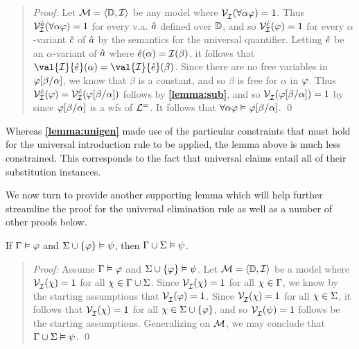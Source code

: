 \begin{quote} 
  \textit{Proof:} Let $\mathcal{M}=\langle\mathbb{D},\mathcal{I}\rangle$ be any model where $\mathcal{V}_{\mathcal{I}}^{}(\forall \alpha\varphi) = 1$.
  Thus $\mathcal{V}_{\mathcal{I}}^{\hat{a}}(\forall \alpha\varphi)=1$ for every v.a. $\hat{a}$ defined over $\mathbb{D}$, and so $\mathcal{V}_{\mathcal{I}}^{\hat{c}}(\varphi)=1$ for every $\alpha$-variant $\hat{c}$ of $\hat{a}$ by the semantics for the universal quantifier.
  Letting $\hat{e}$ be an $\alpha$-variant of $\hat{a}$ where $\hat{e}(\alpha)=\mathcal{I}(\beta)$, it follows that $\val{\I}{\va{e}}(\alpha)=\val{\I}{\va{e}}(\beta)$.
  Since there are no free variables in $\varphi[\beta/\alpha]$, we know that $\beta$ is a constant, and so $\beta$ is free for $\alpha$ in $\varphi$.
  Thus $\mathcal{V}_{\mathcal{I}}^{\hat{e}}(\varphi)=\mathcal{V}_{\mathcal{I}}^{\hat{e}}(\varphi[\beta/\alpha])$ follows by \textbf{\ref{lemma:sub}}, and so $\mathcal{V}_{\mathcal{I}}^{}(\varphi[\beta/\alpha])=1$ by  since $\varphi[\beta/\alpha]$ is a wfs of $\mathcal{L}^{=}$.
  It follows that $\forall\alpha\varphi \vDash \varphi[\beta/\alpha]$.
  \qed
\end{quote}

Whereas \textbf{\ref{lemma:unigen}} made use of the particular constraints that must hold for the universal introduction rule to be applied, the lemma above is much less constrained.
This corresponds to the fact that universal claims entail all of their substitution instances.

We now turn to provide another supporting lemma which will help further streamline the proof for the universal elimination rule as well as a number of other proofs below.




\begin{Lthm} \label{lemma:cut}
  If $\Gamma \vDash \varphi$ and $\Sigma \cup \lbrace\varphi\rbrace \vDash \psi$, then $\Gamma\cup\Sigma \vDash \psi$. 
\end{Lthm}

\begin{quote} 
  \textit{Proof:} Assume $\Gamma \vDash \varphi$ and $\Sigma \cup \lbrace\varphi\rbrace \vDash \psi$.
  Let $\mathcal{M} = \langle\mathbb{D}, \mathcal{I}\rangle$ be a model where $\mathcal{V}_{\mathcal{I}}^{}(\chi) = 1$ for all $\chi \in \Gamma\cup\Sigma$.
  Since $\mathcal{V}_{\mathcal{I}}^{}(\chi) = 1$ for all $\chi \in \Gamma$, we know by the starting assumptions that $\mathcal{V}_{\mathcal{I}}^{}(\varphi) = 1$.
  Since $\mathcal{V}_{\mathcal{I}}^{}(\chi) = 1$ for all $\chi \in \Sigma$, it follows that $\mathcal{V}_{\mathcal{I}}^{}(\chi) = 1$ for all $\chi \in \Sigma\cup\lbrace\varphi\rbrace$, and so $\mathcal{V}_{\mathcal{I}}^{}(\psi) = 1$ follows be the starting assumptions.
  Generalizing on $\mathcal{M}$, we may conclude that $\Gamma\cup\Sigma\vDash\psi$.
  \qed
\end{quote}

